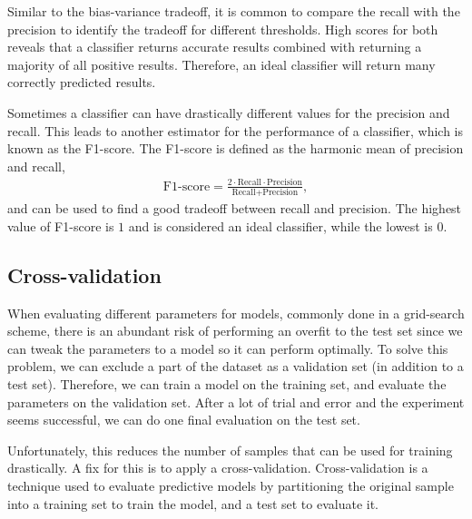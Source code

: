 Similar to the bias-variance tradeoff, it is common to compare the recall with the precision to identify the tradeoff for different thresholds. High scores for both reveals that a classifier returns accurate results combined with returning a majority of all positive results. Therefore, an ideal classifier will return many correctly predicted results.

Sometimes a classifier can have drastically different values for the precision and recall. This leads to another estimator for the performance of a classifier, which is known as the F1-score. The F1-score is defined as the harmonic mean of precision and recall,
\begin{align*}
\text{F1-score} = \frac{2\cdot \text{Recall} \cdot \text{Precision}}{\text{Recall} + \text{Precision}},
\end{align*}
and can be used to find a good tradeoff between recall and precision. The highest value of F1-score is $1$ and is considered an ideal classifier, while the lowest is $0$.

\subsection{Cross-validation}

When evaluating different parameters for models, commonly done in a grid-search scheme, there is an abundant risk of performing an overfit to the test set since we can tweak the parameters to a model so it can perform optimally. To solve this problem, we can exclude a part of the dataset as a validation set (in addition to a test set). Therefore, we can train a model on the training set, and evaluate the parameters on the validation set. After a lot of trial and error and the experiment seems successful, we can do one final evaluation on the test set.

Unfortunately, this reduces the number of samples that can be used for training drastically. A fix for this is to apply a cross-validation. Cross-validation is a technique used to evaluate predictive models by partitioning the original sample into a training set to train the model, and a test set to evaluate it.



